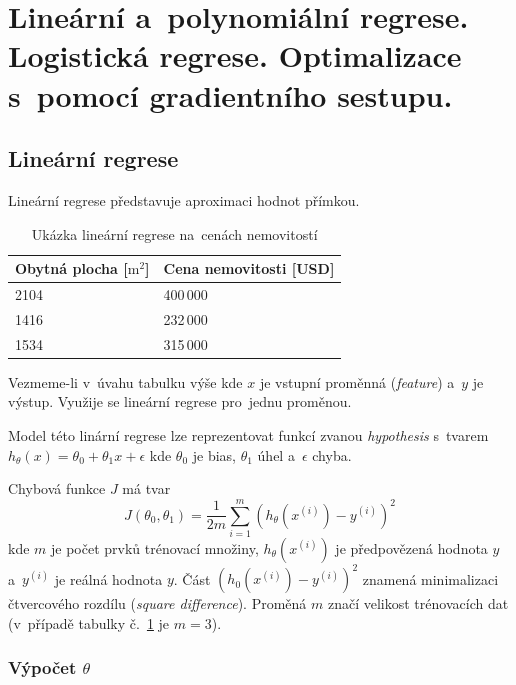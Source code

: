 \clearpage
\section{Lineární a~polynomiální regrese. Logistická regrese. Optimalizace s~pomocí gradientního sestupu.}

\subsection{Lineární regrese}

Lineární regrese představuje aproximaci hodnot přímkou.

\begin{table}[h]
    \centering
    \begin{tabular}{ |l|l| }
        Obytná plocha [$\text{m}^2$] & Cena nemovitosti [USD] \\ \hline \hline
        2104                         & 400\,000               \\ \hline
        1416                         & 232\,000               \\ \hline
        1534                         & 315\,000               \\ \hline
    \end{tabular}
    \caption{Ukázka lineární regrese na~cenách nemovitostí}
    \label{tabulka-linearni-regrese}
\end{table}

Vezmeme-li v~úvahu tabulku výše kde $x$ je vstupní proměnná (\emph{feature}) a~$y$ je výstup.
Využije se lineární regrese pro~jednu proměnou.

Model této linární regrese lze reprezentovat funkcí zvanou \emph{hypothesis} s~tvarem $h_\theta(x) = \theta_0 + \theta_1 x + \epsilon$
kde $\theta_0$ je bias, $\theta_1$ úhel a~$\epsilon$ chyba.

Chybová funkce $J$ má tvar
$$J(\theta_0, \theta_1) = \frac{1}{2m} \sum_{i=1}^{m} (h_\theta (x^{(i)}) - y^{(i)})^2$$
kde $m$ je počet prvků trénovací množiny, $h_\theta(x^{(i)})$ je předpovězená hodnota $y$ a~$y^{(i)}$ je reálná hodnota $y$.
Část $(h_0(x^{(i)})-y^{(i)})^2$ znamená minimalizaci čtvercového rozdílu (\emph{square difference}).
Proměná $m$ značí velikost trénovacích dat (v~případě tabulky č.~\ref{tabulka-linearni-regrese} je $m= 3$).

\subsubsection{Výpočet $\theta$}

